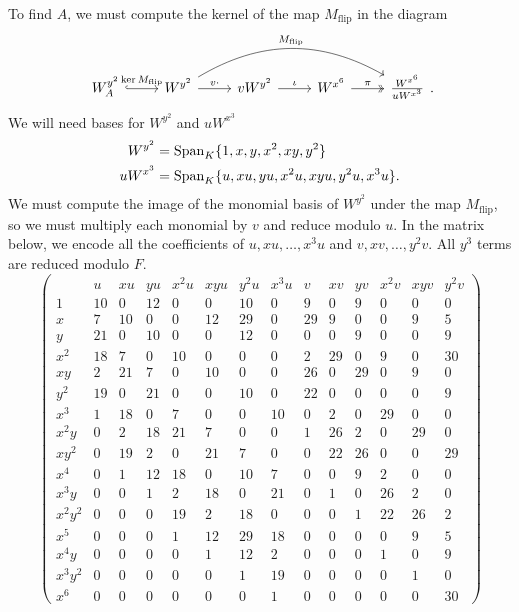 To find $A$, we must compute the kernel of the map $M_{\text{flip}}$ in the diagram
\[ \begin{tikzcd}
  W_A^{y^2} \arrow[hook]{r}{\ker M_{\text{flip}}} &
  W^{y^2} \arrow{r}{v \cdot} \arrow[bend left]{rrr}{M_{\text{flip}}} &
  vW^{y^2} \arrow{r}{\iota} &
  W^{x^6} \arrow[two heads]{r}{\pi} &
  \frac {W^{x^6}} {uW^{x^3}}
\end{tikzcd}. \]
We will need bases for $W^{y^2}$ and $uW^{x^3}$
\begin{align*}
  W^{y^2} &= \operatorname{Span}_K\{ 1, x, y, x^2, xy, y^2 \} \\
  uW^{x^3} &= \operatorname{Span}_K\{ u, xu, yu, x^2u, xyu, y^2u, x^3u \}.
\end{align*}
We must compute the image of the monomial basis of $W^{y^2}$ under the map $M_{\text{flip}}$,
so we must multiply each monomial by $v$ and reduce modulo $u$.
In the matrix below, we encode all the coefficients of $u, xu, \ldots, x^3u$ and $v, xv, \ldots, y^2v$.
All $y^3$ terms are reduced modulo $F$.
\[ \left( \begin{array}{r|rrrrrrr|rrrrrr}
         & u & xu & yu & x^2u & xyu & y^2u & x^3u & v & xv & yv & x^2v & xyv & y^2v \\
  \hline
     1 & 10 &  0 & 12 &  0 &  0 & 10 &  0 &  9 &  0 &  9 &  0 &  0 &  0 \\
     x &  7 & 10 &  0 &  0 & 12 & 29 &  0 & 29 &  9 &  0 &  0 &  9 &  5 \\
     y & 21 &  0 & 10 &  0 &  0 & 12 &  0 &  0 &  0 &  9 &  0 &  0 &  9 \\
   x^2 & 18 &  7 &  0 & 10 &  0 &  0 &  0 &  2 & 29 &  0 &  9 &  0 & 30 \\
    xy &  2 & 21 &  7 &  0 & 10 &  0 &  0 & 26 &  0 & 29 &  0 &  9 &  0 \\
   y^2 & 19 &  0 & 21 &  0 &  0 & 10 &  0 & 22 &  0 &  0 &  0 &  0 &  9 \\
   x^3 &  1 & 18 &  0 &  7 &  0 &  0 & 10 &  0 &  2 &  0 & 29 &  0 &  0 \\
  x^2y &  0 &  2 & 18 & 21 &  7 &  0 &  0 &  1 & 26 &  2 &  0 & 29 &  0 \\
  xy^2 &  0 & 19 &  2 &  0 & 21 &  7 &  0 &  0 & 22 & 26 &  0 &  0 & 29 \\
   x^4 &  0 &  1 & 12 & 18 &  0 & 10 &  7 &  0 &  0 &  9 &  2 &  0 &  0 \\
  x^3y &  0 &  0 &  1 &  2 & 18 &  0 & 21 &  0 &  1 &  0 & 26 &  2 &  0 \\
x^2y^2 &  0 &  0 &  0 & 19 &  2 & 18 &  0 &  0 &  0 &  1 & 22 & 26 &  2 \\
   x^5 &  0 &  0 &  0 &  1 & 12 & 29 & 18 &  0 &  0 &  0 &  0 &  9 &  5 \\
  x^4y &  0 &  0 &  0 &  0 &  1 & 12 &  2 &  0 &  0 &  0 &  1 &  0 &  9 \\
x^3y^2 &  0 &  0 &  0 &  0 &  0 &  1 & 19 &  0 &  0 &  0 &  0 &  1 &  0 \\
   x^6 &  0 &  0 &  0 &  0 &  0 &  0 &  1 &  0 &  0 &  0 &  0 &  0 & 30
\end{array} \right) \]

